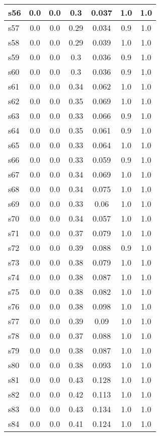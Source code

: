 \documentclass{article}
\begin{document}
\begin{tabular}{|l|c|c|c|c|c|c|}
\hline
s56 &0.0 & 0.0 & 0.3 & 0.037 & 1.0 & 1.0\\
\hline
s57 &0.0 & 0.0 & 0.29 & 0.034 & 0.9 & 1.0\\
\hline
s58 &0.0 & 0.0 & 0.29 & 0.039 & 1.0 & 1.0\\
\hline
s59 &0.0 & 0.0 & 0.3 & 0.036 & 0.9 & 1.0\\
\hline
s60 &0.0 & 0.0 & 0.3 & 0.036 & 0.9 & 1.0\\
\hline
s61 &0.0 & 0.0 & 0.34 & 0.062 & 1.0 & 1.0\\
\hline
s62 &0.0 & 0.0 & 0.35 & 0.069 & 1.0 & 1.0\\
\hline
s63 &0.0 & 0.0 & 0.33 & 0.066 & 0.9 & 1.0\\
\hline
s64 &0.0 & 0.0 & 0.35 & 0.061 & 0.9 & 1.0\\
\hline
s65 &0.0 & 0.0 & 0.33 & 0.064 & 1.0 & 1.0\\
\hline
s66 &0.0 & 0.0 & 0.33 & 0.059 & 0.9 & 1.0\\
\hline
s67 &0.0 & 0.0 & 0.34 & 0.069 & 1.0 & 1.0\\
\hline
s68 &0.0 & 0.0 & 0.34 & 0.075 & 1.0 & 1.0\\
\hline
s69 &0.0 & 0.0 & 0.33 & 0.06 & 1.0 & 1.0\\
\hline
s70 &0.0 & 0.0 & 0.34 & 0.057 & 1.0 & 1.0\\
\hline
s71 &0.0 & 0.0 & 0.37 & 0.079 & 1.0 & 1.0\\
\hline
s72 &0.0 & 0.0 & 0.39 & 0.088 & 0.9 & 1.0\\
\hline
s73 &0.0 & 0.0 & 0.38 & 0.079 & 1.0 & 1.0\\
\hline
s74 &0.0 & 0.0 & 0.38 & 0.087 & 1.0 & 1.0\\
\hline
s75 &0.0 & 0.0 & 0.38 & 0.082 & 1.0 & 1.0\\
\hline
s76 &0.0 & 0.0 & 0.38 & 0.098 & 1.0 & 1.0\\
\hline
s77 &0.0 & 0.0 & 0.39 & 0.09 & 1.0 & 1.0\\
\hline
s78 &0.0 & 0.0 & 0.37 & 0.088 & 1.0 & 1.0\\
\hline
s79 &0.0 & 0.0 & 0.38 & 0.087 & 1.0 & 1.0\\
\hline
s80 &0.0 & 0.0 & 0.38 & 0.093 & 1.0 & 1.0\\
\hline
s81 &0.0 & 0.0 & 0.43 & 0.128 & 1.0 & 1.0\\
\hline
s82 &0.0 & 0.0 & 0.42 & 0.113 & 1.0 & 1.0\\
\hline
s83 &0.0 & 0.0 & 0.43 & 0.134 & 1.0 & 1.0\\
\hline
s84 &0.0 & 0.0 & 0.41 & 0.124 & 1.0 & 1.0\\

\end{tabular}
\end{document}
